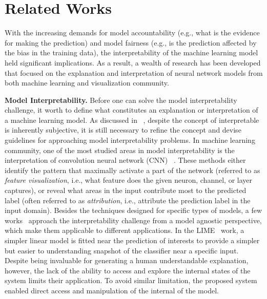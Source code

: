 
\section{Related Works}
With the increasing demands for model accountability (e.g., what is the evidence for making the prediction) and model fairness (e.g., is the prediction affected by the bias in the training data),
the interpretability of the machine learning model held significant implications. As a result, a wealth of research has been developed that focused on the explanation and interpretation of neural network models from both machine learning and visualization community.

\textbf{Model Interpretability.}
Before one can solve the model interpretability challenge, it worth to define what constitutes an explanation or interpretation of a machine learning model.
As discussed in ~\cite{Lipton2016, Doshi-Velez2017}, despite the concept of interpretable is inherently subjective, it is still necessary to refine the concept and devise guidelines for approaching model interpretability problems.
In machine learning community, one of the most studied areas in model interpretability is the interpretation of convolution neural network (CNN) ~\cite{SimonyanVedaldiZisserman2013, ZeilerFergus2014, YosinskiCluneNguyen2015, OlahMordvintsevSchubert2017, OlahSatyanarayanJohnson2018}.
%
These methods either identify the pattern that maximally activate a part of the network (referred to as \emph{feature visualization}, i.e., what feature does the given neuron, channel, or layer captures), or reveal what areas in the input contribute most to the predicted label (often referred to as \emph{attribution}, i.e., attribute the prediction label in the input domain).
%
Besides the techniques designed for specific types of models, a few works~\cite{RibeiroSinghGuestrin2016, LundbergLee2017} approach the interpretability challenge from a model agnostic perspective, which make them applicable to different applications. In the LIME~\cite{RibeiroSinghGuestrin2016} work, a simpler linear model is fitted near the prediction of interests to provide a simpler but easier to understanding snapshot of the classifier near a specific input.
%
Despite being invaluable for generating a human understandable explanation, however, the lack of the ability to access and explore the internal states of the system limits their application. 
To avoid similar limitation, the proposed system enabled direct access and manipulation of the internal of the model.


